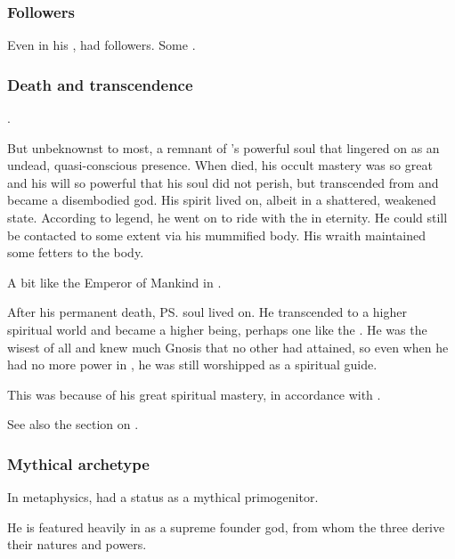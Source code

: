 \subsubsection{Followers}
Even in his , \Sethicus had followers.
Some \ophidians {}. 





\subsubsection{Death and transcendence}
\Sethicus {}. 

But unbeknownst to most, a remnant of \Sethicus's powerful soul that lingered on as an undead, quasi-conscious presence.
When \Sethicus died, his occult mastery was so great and his will so powerful that his soul did not perish, but transcended from \Miith and became a disembodied god.
His spirit lived on, albeit in a shattered, weakened state.
According to legend, he went on to ride with the \xss in eternity.
He could still be contacted to some extent via his mummified body.
His wraith maintained some fetters to the body.

A bit like the Emperor of Mankind in \cite{RPG:Warhammer40000}.

After his permanent death, \ps{\Sethicus} soul lived on. 
He transcended to a higher spiritual world and became a higher being, perhaps one like the \xss. 
He was the wisest of all \dragons and knew much Gnosis that no other \dragon had attained, so even when he had no more power in \Miith, he was still worshipped as a spiritual guide. 

This was because of his great spiritual mastery, in accordance with . 

See also the section on . 





\subsubsection{Mythical archetype}
In \draconian metaphysics, \Sethicus had a status as a mythical primogenitor. 

He is featured heavily in \WanderersInDarknessEmph as a supreme founder god, from whom the three  derive their natures and powers. 

